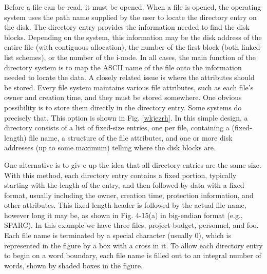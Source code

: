 Before a file can be read, it must be opened. When a file is opened, the operating
system uses the path name supplied by the user to locate the directory entry on
the disk. The directory entry provides the information needed to find the disk
blocks. Depending on the system, this information may be the disk address of the
entire file (with contiguous allocation), the number of the first block (both linked-
list schemes), or the number of the i-node. In all cases, the main function of the
directory system is to map the ASCII name of the file onto the information needed
to locate the data.
A closely related issue is where the attributes should be stored. Every file system
maintains various file attributes, such as each file’s owner and creation time,
and they must be stored somewhere. One obvious possibility is to store them directly
in the directory entry. Some systems do precisely that. This option is shown
in Fig. \ref{wkjezrh}. In this simple design, a directory consists of a list of fixed-size entries,
one per file, containing a (fixed-length) file name, a structure of the file attributes,
and one or more disk addresses (up to some maximum) telling where the
disk blocks are.


One alternative is to giv e up the idea that all directory entries are the same size.
With this method, each directory entry contains a fixed portion, typically starting
with the length of the entry, and then followed by data with a fixed format, usually
including the owner, creation time, protection information, and other attributes.
This fixed-length header is followed by the actual file name, however long it may
be, as shown in Fig. 4-15(a) in big-endian format (e.g., SPARC). In this example
we have three files, project-budget, personnel, and foo. Each file name is terminated
by a special character (usually 0), which is represented in the figure by a box
with a cross in it. To allow each directory entry to begin on a word boundary, each
file name is filled out to an integral number of words, shown by shaded boxes in
the figure.

